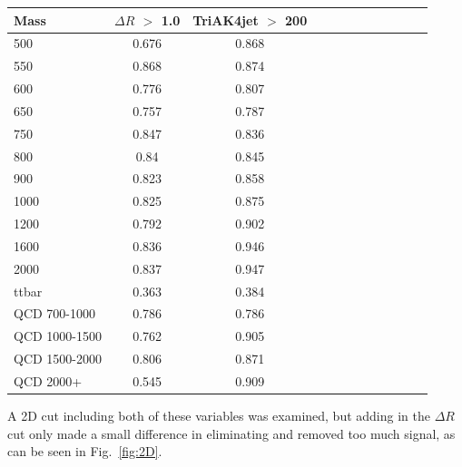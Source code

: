 \begin{table}[h]
\label{tab:dRinvM}
\begin{tabular}{|l|c|c|c|c|c|c|c|c|c|c|c|}
\hline
Mass & $\Delta R$ $>$ 1.0 & TriAK4jet $>$ 200\\ \hline
500 & 0.676 & 0.868\\
550 & 0.868 & 0.874\\
600 & 0.776 & 0.807\\
650 & 0.757 & 0.787\\
750 & 0.847 & 0.836\\
800 & 0.84 & 0.845\\
900 & 0.823 & 0.858\\
1000 & 0.825 & 0.875\\
1200 & 0.792 & 0.902\\
1600 & 0.836 & 0.946\\
2000 & 0.837 & 0.947\\
ttbar & 0.363 & 0.384\\
QCD 700-1000 & 0.786 & 0.786\\
QCD 1000-1500 & 0.762 & 0.905\\
QCD 1500-2000 & 0.806 & 0.871\\
QCD 2000+ & 0.545 & 0.909\\
\hline
\end{tabular}
\end{table}

A 2D cut including both of these variables was examined, but adding in the $\Delta R$ cut only made a small difference in eliminating \ttbar and removed too much signal, as can be seen in Fig.~\ref{fig:2D}.

